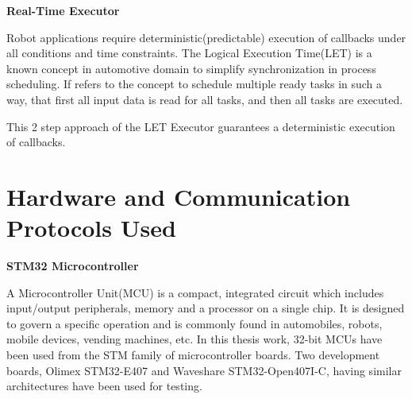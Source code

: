 \documentclass[%
xelatex,
	oneside,		%
	12pt,			%
	parskip=half,	%
	abstracton,
	chapterprefix=true%
    appendixprefix=true]
{scrbook}
\begin{document}
 
  \vspace*{0.5cm}
  
  {\bfseries Real-Time Executor}
  \vspace*{0.5cm}
  
  
Robot applications require deterministic(predictable) execution of callbacks under all conditions and time constraints.
The Logical Execution Time(LET) is a known concept in automotive domain to simplify synchronization in process scheduling. If refers to the concept to schedule multiple ready tasks in such a way, that first all input data is read for all tasks, and then all tasks are executed.\cite{let}

This 2 step approach of the LET Executor guarantees a deterministic execution of callbacks.
 
	\section{Hardware and Communication Protocols Used}
	
	\vspace*{0.5cm}
	{\bfseries STM32 Microcontroller}
	
	
	\vspace*{0.5cm}
A Microcontroller Unit(MCU)	is a compact, integrated circuit which includes input/output peripherals, memory and a processor on a single chip. It is designed to govern a specific operation and is commonly found in automobiles, robots, mobile devices, vending machines, etc. In this thesis work, 32-bit MCUs have been used from the STM family of microcontroller boards. Two development boards, Olimex STM32-E407 and Waveshare STM32-Open407I-C, having similar architectures have been used for testing.
\end{document}
